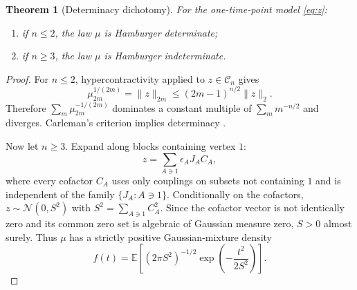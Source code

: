 \documentclass[11pt,a4paper]{article}
\newtheorem{theorem}{Theorem}[section]
\theoremstyle{definition}
\theoremstyle{remark}
\newcommand{\E}{\mathbb{E}}
\newcommand{\Ccal}{\mathcal{C}}
\newcommand{\norm}[1]{\lVert#1\rVert}
\begin{document}
\begin{theorem}[Determinacy dichotomy]\label{thm:moment}
For the one-time-point model \eqref{eq:z}:
\begin{enumerate}
\item if $n\le2$, the law $\mu$ is Hamburger determinate;
\item if $n\ge3$, the law $\mu$ is Hamburger indeterminate.
\end{enumerate}
\end{theorem}

\begin{proof}
For $n\le2$, hypercontractivity applied to $z\in\Ccal_n$ gives
\[
 \mu_{2m}^{1/(2m)}=\norm{z}_{2m}
 \le(2m-1)^{n/2}\norm{z}_2.
\]
Therefore $\sum_m\mu_{2m}^{-1/(2m)}$ dominates a constant multiple of
$\sum_m m^{-n/2}$ and diverges.  Carleman's criterion implies determinacy
\citep{Akhiezer1965,Simon1998}.

Now let $n\ge3$.  Expand along blocks containing vertex $1$:
\begin{equation}
 z=\sum_{A\ni1}\epsilon_AJ_A C_A,
 \label{eq:cofactor}
\end{equation}
where every cofactor $C_A$ uses only couplings on subsets not containing $1$ and is
independent of the family $\{J_A:A\ni1\}$.  Conditionally on the cofactors,
$z\sim\mathcal N(0,S^2)$ with $S^2=\sum_{A\ni1}C_A^2$.  Since the cofactor vector is not
identically zero and its common zero set is algebraic of Gaussian measure zero, $S>0$
almost surely.  Thus $\mu$ has a strictly positive Gaussian-mixture density
\begin{equation}
 f(t)=\E\left[(2\pi S^2)^{-1/2}\exp\!\left(-\frac{t^2}{2S^2}\right)\right].
 \label{eq:density}
\end{equation}


\end{proof}
\end{document}
